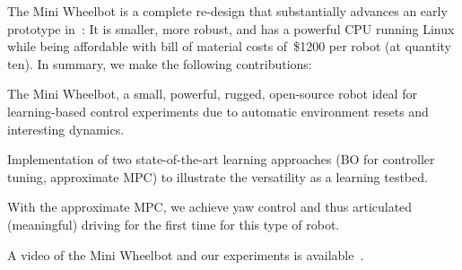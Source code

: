 The Mini Wheelbot is a complete re-design that substantially advances an early prototype in~\cite{geist2022wheelbot}: It is smaller, more robust, and has a powerful CPU running Linux while being affordable with bill of material costs of~\$1200 per robot (at quantity ten).
In summary, we make the following contributions:
\begin{compactenum}
    \item The Mini Wheelbot, a small, powerful, rugged, open-source robot ideal for learning-based control experiments due to automatic environment resets and interesting dynamics.
    \item Implementation of two state-of-the-art learning approaches (BO for controller tuning, approximate MPC) to illustrate the versatility as a learning testbed.
    \item With the approximate MPC, we achieve yaw control and thus articulated (meaningful) driving for the first time for this type of robot.
\end{compactenum}
A video of the Mini Wheelbot and our experiments is available~\videolink.
